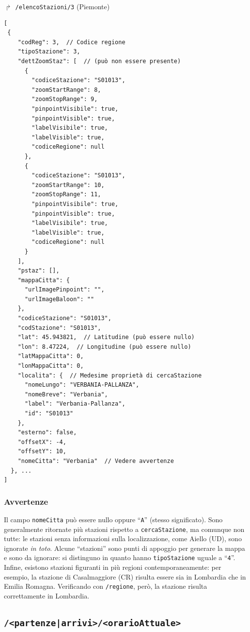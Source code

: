 \documentclass[12pt,italian]{report}
\begin{document}
$\Rsh$ \texttt{/elencoStazioni/3} \hfill (Piemonte)
\begin{verbatim}
[
 {
    "codReg": 3,  // Codice regione
    "tipoStazione": 3,
    "dettZoomStaz": [  // (può non essere presente)
      {
        "codiceStazione": "S01013",
        "zoomStartRange": 8,
        "zoomStopRange": 9,
        "pinpointVisibile": true,
        "pinpointVisible": true,
        "labelVisibile": true,
        "labelVisible": true,
        "codiceRegione": null
      },
      {
        "codiceStazione": "S01013",
        "zoomStartRange": 10,
        "zoomStopRange": 11,
        "pinpointVisibile": true,
        "pinpointVisible": true,
        "labelVisibile": true,
        "labelVisible": true,
        "codiceRegione": null
      }
    ],
    "pstaz": [],
    "mappaCitta": {
      "urlImagePinpoint": "",
      "urlImageBaloon": ""
    },
    "codiceStazione": "S01013",
    "codStazione": "S01013",
    "lat": 45.943821,  // Latitudine (può essere nullo)
    "lon": 8.47224,  // Longitudine (può essere nullo)
    "latMappaCitta": 0,
    "lonMappaCitta": 0,
    "localita": {  // Medesime proprietà di cercaStazione
      "nomeLungo": "VERBANIA-PALLANZA",
      "nomeBreve": "Verbania",
      "label": "Verbania-Pallanza",
      "id": "S01013"
    },
    "esterno": false,
    "offsetX": -4,
    "offsetY": 10,
    "nomeCitta": "Verbania"  // Vedere avvertenze
  }, ...
]
\end{verbatim}

\subsubsection{Avvertenze}

Il campo \texttt{nomeCitta} può essere nullo oppure ``\texttt{A}''
(stesso significato).  Sono generalmente ritornate più stazioni
rispetto a \texttt{cercaStazione}, ma comunque non tutte: le stazioni
senza informazioni sulla localizzazione, come Aiello (UD), sono
ignorate \textit{in toto}.  Alcune ``stazioni'' sono punti di appoggio
per generare la mappa e sono da ignorare: si distinguno in quanto
hanno \texttt{tipoStazione} uguale a ``\texttt{4}''.  Infine, esistono
stazioni figuranti in più regioni contemporaneamente: per esempio, la
stazione di Casalmaggiore (CR) risulta essere sia in Lombardia che in
Emilia Romagna.  Verificando con \texttt{/regione}, però, la stazione
risulta correttamente in Lombardia.

\subsection{\texttt{/<partenze|arrivi>/<orarioAttuale>}}
\label{partenzeArrivi}
\end{document}
